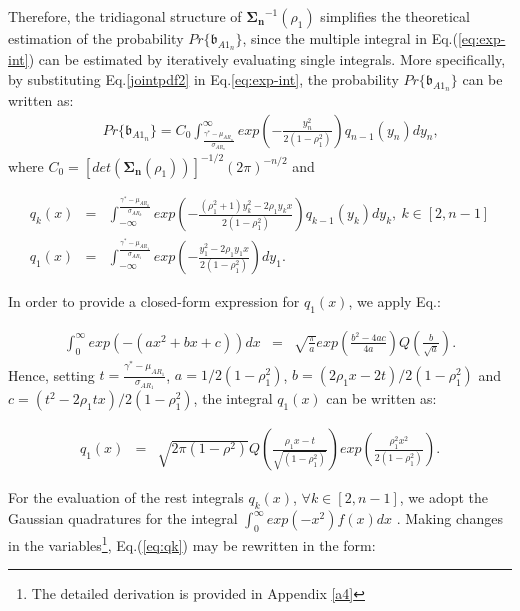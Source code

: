\documentclass[12pt,draftcls, onecolumn]{IEEEtran}
\begin{document}
\endgroup
Therefore, the tridiagonal structure of $\mathbf{\Sigma_n}^{-1}\left(\rho_1\right)$ simplifies the theoretical estimation of the probability $Pr\{\mathfrak{b}_{A1_n}\}$, since the multiple integral in Eq.(\ref{eq:exp-int}) can be estimated by iteratively evaluating single integrals. More specifically, by substituting Eq.\eqref{jointpdf2} in Eq.\eqref{eq:exp-int}, the probability $Pr\{\mathfrak{b}_{A1_n}\}$ can be written as:
\begingroup
\begin{eqnarray}
&&Pr\{\mathfrak{b}_{A1_n}\} = C_0\int^{\infty}_{\frac{\gamma^*-\mu_{AR_n}}{\sigma_{AR_n}}}exp\left(-\frac{ y^2_n}{2\left(1-\rho_1^2\right)}\right)q_{n-1}\left(y_n\right)dy_n,\label{eq:exp-int2}
\end{eqnarray}
\endgroup
where $C_0 = [det\left(\mathbf{\Sigma_n}\left(\rho_1\right)\right)]^{-1/2}\left(2\pi\right)^{-n/2}$ and

\begingroup
\begin{eqnarray}
q_{k}\left(x\right) & = & \int^{\frac{\gamma^*-\mu_{AR_k}}{\sigma_{AR_k}}}_{-\infty}exp\left(-\frac{\left(\rho_1^2+1\right)y^2_k-2\rho_1 y_kx}{2\left(1-\rho_1^2\right)}\right)q_{k-1}(y_k)dy_k,\ k \in [2,n-1]\label{eq:qk}\\
q_1\left(x\right)   & = & \int^{\frac{\gamma^*-\mu_{AR_1}}{\sigma_{AR_1}}}_{-\infty}exp\left(-\frac{y^2_1-2\rho_1 y_1x}{2\left(1-\rho_1^2\right)}\right) dy_1.
\end{eqnarray}
\endgroup

\noindent In order to provide a closed-form expression for $q_1\left(x\right)$, we apply Eq.\cite[(15.74)]{book2}:

\begingroup
\begin{eqnarray}
\int^{\infty}_{0}exp\left(-\left(ax^2+bx+c\right)\right)dx &=&\sqrt{\frac{\pi}{a}}exp\left(\frac{b^2-4ac}{4a}\right)Q\left(\frac{b}{\sqrt{a}}\right).\label{closedform}
\end{eqnarray}
\endgroup
Hence, setting $t= \frac{\gamma^*-\mu_{AR_1}}{\sigma_{AR_1}}$, $a = 1/2(1-\rho_1^2)$, $b=(2\rho_1 x-2 t)/2(1-\rho_1^2)$ and $c=(t^2-2\rho_1 tx)/2(1-\rho_1^2)$, the integral $q_1\left(x\right)$ can be written as:

\begingroup

\begin{eqnarray}
q_1(x) & = & \sqrt{2\pi\left(1-\rho^2\right)} Q\left(\frac{\rho_1 x-t}{\sqrt{\left(1-\rho_1^2\right)}}\right)exp\left(\frac{\rho_1^2x^2}{2(1-\rho_1^2)}\right).
\end{eqnarray}
\endgroup


For the evaluation of the rest integrals $q_k\left(x\right)$, $\forall k \in [2,n-1]$, we adopt the Gaussian quadratures for the integral $\int^{\infty}_{0}exp\left(-x^2\right)f(x)dx$ \cite[Table II, N=15]{1969method}. Making changes in the variables\footnote{The detailed derivation is provided in Appendix \ref{a4}}, Eq.(\ref{eq:qk}) may be rewritten in the form:
\end{document}
